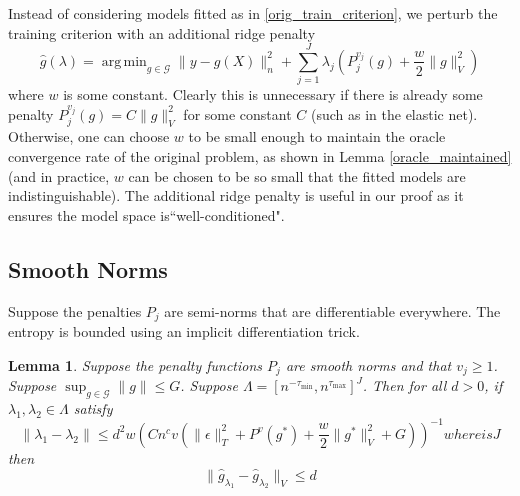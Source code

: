 \documentclass[12pt]{article}
\newtheorem{lemma}{Lemma}
\DeclareMathOperator*{\argmin}{arg\,min}
\begin{document}
Instead of considering models fitted as in \eqref{orig_train_criterion}, we perturb the training criterion with an additional ridge penalty
\begin{equation}
\label{train_crit_ridge}
\hat{g}(\lambda) = \argmin_{g\in \mathcal{G}} \| y -  g(X) \|^2_n + \sum_{j=1}^J \lambda_j \left ( P^{v_j}_j(g) + \frac{w}{2} \| g \|^2_V \right )
\end{equation}
where $w$ is some constant. Clearly this is unnecessary if there is already some penalty $P^{v_j}_j(g) = C \| g \|_V^2$ for some constant $C$ (such as in the elastic net). Otherwise, one can choose $w$ to be small enough to maintain the oracle convergence rate of the original problem, as shown in Lemma \ref{oracle_maintained} (and in practice, $w$ can be chosen to be so small that the fitted models are indistinguishable). The additional ridge penalty is useful in our proof as it ensures the model space is``well-conditioned".

\subsection{Smooth Norms}
Suppose the penalties $P_j$ are semi-norms that are differentiable everywhere. The entropy is bounded using an implicit differentiation trick.

\begin{lemma}
\label{smooth_entropy_lemma}
Suppose the penalty functions $P_j$ are smooth norms and that $v_j \ge 1$. Suppose $\sup_{g \in \mathcal{G}} \|g\| \le G$. 
Suppose $\Lambda = [n^{- \tau_{\min}} , n^{\tau_{\max}}]^J$.
Then for all $d > 0$, if $\lambda_1, \lambda_2 \in \Lambda$ satisfy
\begin{equation}
\label{lambda_close_condition}
\| \lambda_1 -  \lambda_2 \| \le  d^2 w \left ( Cn^{c}v\left(\|\epsilon\|_{T}^{2}+P^{v}(g^{*})+\frac{w}{2}\|g^{*}\|_V^{2}+G\right) \right )^{-1} whereisJ
\end{equation}
then
\begin{equation}
\| \hat{g}_{\lambda_1} -  \hat{g}_{\lambda_2} \|_V \le d
\end{equation}
\end{lemma}
\end{document}

